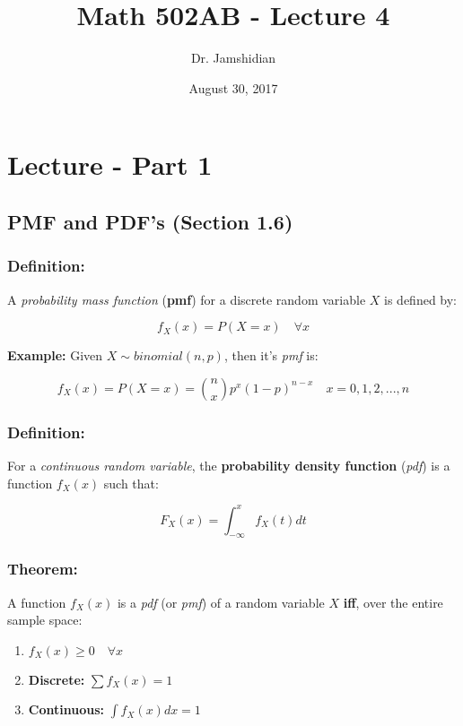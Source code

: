 \documentclass{article}
\title{Math 502AB - Lecture 4}
\author{Dr. Jamshidian}
\date{August 30, 2017}
\begin{document}
\maketitle

\section{Lecture - Part 1}

\subsection{PMF and PDF's (Section 1.6)}

\subsubsection*{Definition:}

A \textit{probability mass function} (\textbf{pmf}) for a discrete random variable $X$ is defined by:

\begin{equation*}
 f_X(x) = P(X=x) \quad \forall x
\end{equation*}

\textbf{Example:} Given $X\sim binomial(n,p)$, then it's \textit{pmf} is:

\begin{equation*}
    f_X(x) = P(X=x) = {n\choose x}p^x (1-p)^{n-x} \quad x = 0,1,2,...,n
\end{equation*}

\subsubsection*{Definition:}

For a \textit{continuous random variable}, the \textbf{probability density function} (\textit{pdf}) is a function $f_X(x)$ such that:

\begin{equation*}
    F_X(x) = \int_{-\infty}^x f_X(t) dt
\end{equation*}

\subsubsection*{Theorem:}

A function $f_X(x)$ is a \textit{pdf} (or \textit{pmf}) of a random variable $X$ \textbf{iff}, over the entire sample space:
\begin{enumerate}
    \item $f_X(x) \geq 0 \quad \forall x$
    \item \textbf{Discrete:} $\sum f_X(x) = 1$
    \item \textbf{Continuous:} $\int f_X(x) dx = 1$
\end{enumerate}
\end{document}
